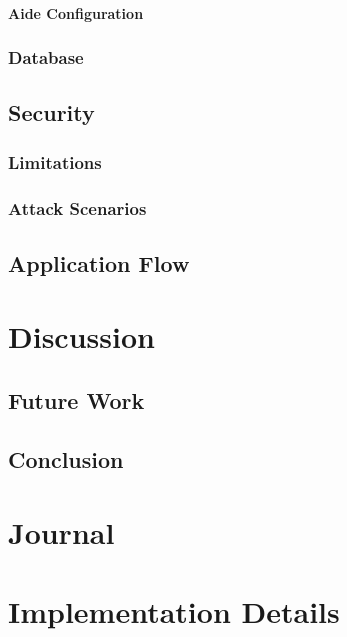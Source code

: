 \documentclass[
	a4paper,					%
	10pt,							%
	twoside,					%
	openright,				%
	notitlepage,			%
	parskip=half,			%
]{scrreprt}					%
\begin{document}
\subsubsection{Aide Configuration}
\label{sec:aide:config}

\subsection{Database}
\label{sec:Database}

\section{Security}
\label{sec:Security}

\subsection{Limitations}
\label{sec:Limitations}

\subsection{Attack Scenarios}
\label{sec:attack_scenarios}

\section{Application Flow}
\label{sec:flwo}

\chapter{Discussion}
\label{sec:Discussion}

\section{Future Work}
\label{sec:future:work}

\section{Conclusion}
\label{sec:Conclusion}

\chapter{Journal}

\chapter{Implementation Details}
\end{document}

